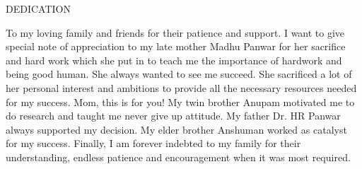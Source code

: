 \begin{center}
DEDICATION
\end{center}
To my loving family and friends for their patience and support. I want to give special
note of appreciation to my late mother Madhu Panwar for her sacrifice and hard work which she
put in to teach me the importance of hardwork and being good human. She always wanted to see
me succeed. She sacrificed a lot of her personal interest and ambitions to provide all the necessary
resources needed for my success. Mom, this is for you! My twin brother Anupam motivated me to
do research and taught me never give up attitude. My father Dr. HR Panwar always supported
my decision. My elder brother Anshuman worked as catalyst for my success. Finally, I am forever
indebted to my family for their understanding, endless patience and encouragement when it was
most required.